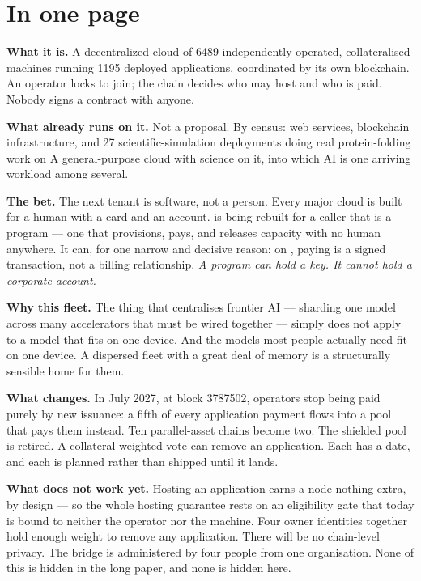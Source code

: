 \section*{In one page}

\textbf{What it is.} A decentralized cloud of \num{6489} independently operated, collateralised
machines running \num{1195} deployed applications, coordinated by its own blockchain. An operator
locks \flux{} to join; the chain decides who may host and who is paid. Nobody signs a contract with
anyone.

\textbf{What already runs on it.} Not a proposal. By census: web services, blockchain
infrastructure, and \num{27} scientific-simulation deployments doing real protein-folding work on
 A general-purpose cloud with science on it, into
which AI is one arriving workload among several.

\textbf{The bet.} The next tenant is software, not a person. Every major cloud is built for a human
with a card and an account. \Flux{} is being rebuilt for a caller that is a program --- one that
provisions, pays, and releases capacity with no human anywhere. It can, for one narrow and decisive
reason: on \Flux{}, paying is a signed transaction, not a billing relationship. \emph{A program can
hold a key. It cannot hold a corporate account.}

\textbf{Why this fleet.} The thing that centralises frontier AI --- sharding one model across many
accelerators that must be wired together --- simply does not apply to a model that fits on one
device. And the models most people actually need fit on one device. A dispersed fleet with a great
deal of memory is a structurally sensible home for them.

\textbf{What changes.} In July 2027, at block \num{3787502}, operators stop being paid purely by new
issuance: a fifth of every application payment flows into a pool that pays them instead. Ten
parallel-asset chains become two. The shielded pool is retired. A collateral-weighted vote can remove
an application. Each has a date, and each is planned rather than shipped until it lands.

\textbf{What does not work yet.} Hosting an application earns a node nothing extra, by design --- so
the whole hosting guarantee rests on an eligibility gate that today is bound to neither the operator
nor the machine. Four owner identities together hold enough weight to remove any application. There
will be no chain-level privacy.  The bridge is administered by four people from one organisation. None of this is hidden in the
long paper, and none is hidden here.

\clearpage
{}
\tableofcontents
\clearpage
